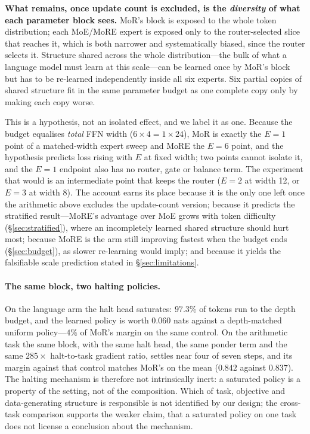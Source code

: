 \textbf{What remains, once update count is excluded, is the \emph{diversity} of
what each parameter block sees.} MoR's block is exposed to the whole token
distribution; each MoE/MoRE expert is exposed only to the router-selected slice
that reaches it, which is both narrower and systematically biased, since the
router selects it. Structure shared across the whole distribution---the bulk of
what a language model must learn at this scale---can be learned once by MoR's
block but has to be re-learned independently inside all six experts. Six partial
copies of shared structure fit in the same parameter budget as one complete copy
only by making each copy worse.

This is a hypothesis, not an isolated effect, and we label it as one. Because the
budget equalises \emph{total} FFN width ($6 \times 4 = 1 \times 24$), MoR is
exactly the $E{=}1$ point of a matched-width expert sweep and MoRE the $E{=}6$
point, and the hypothesis predicts loss rising with $E$ at fixed width; two points
cannot isolate it, and the $E{=}1$ endpoint also has no router, gate or balance
term. The experiment that would is an intermediate point that keeps the router
($E{=}2$ at width 12, or $E{=}3$ at width 8). The
account earns its place because it is the only one left once the
arithmetic above excludes the update-count version; because it predicts the
stratified result---MoRE's advantage over MoE grows with token difficulty
(\S\ref{sec:stratified}), where an incompletely learned shared structure should hurt
most; because MoRE is the arm still improving fastest when the budget ends
(\S\ref{sec:budget}), as slower re-learning would imply; and because it yields the
falsifiable scale prediction stated in \S\ref{sec:limitations}.

\paragraph{The same block, two halting policies.}
On the language arm the halt head saturates: $97.3\%$ of tokens run to the depth
budget, and the learned policy is worth $0.060$ nats against a depth-matched
uniform policy---$4\%$ of MoR's margin on the same control. On the arithmetic
task the same block, with the same halt head, the same ponder term and the same
$285\times$ halt-to-task gradient ratio, settles near four of seven steps, and
its margin against that control matches MoR's on the mean ($0.842$ against
$0.837$). The halting mechanism is therefore not intrinsically inert: a saturated
policy is a property of the setting, not of the composition. Which of task,
objective and data-generating structure is responsible is not identified by our
design; the cross-task comparison supports the weaker claim, that a saturated
policy on one task does not license a conclusion about the mechanism.

